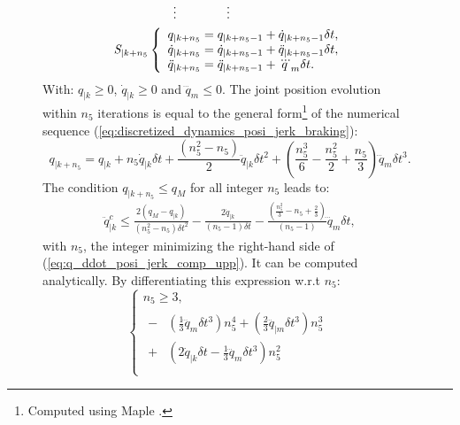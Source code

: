 \begin{figure}[!htbp]
\begin{equation}
\begin{split}
& \hspace{7mm}\vdots\ \hspace{13mm}\vdots\ \\
\textit{S}_{|k+n_{5}}&\left\{\begin{array}{lcl}
q_{|k+n_{5}} = q_{|k+n_{5}-1} + \dot{q}_{|k+n_{5}-1} \delta t, \\
\dot{q}_{|k+n_{5}} = \dot{q}_{|k+n_{5}-1} + \ddot{q}_{|k+n_{5}-1} \delta t, \\
\ddot{q}_{|k+n_{5}} = \ddot{q}_{|k+n_{5}-1} + \dddot{q}_{m} \delta t.
\end{array}\right.
\end{split}
\label{eq:discretized_dynamics_posi_jerk_braking}
\end{equation}
With: $q_{|k} \geq 0$, $\dot{q}_{|k} \geq 0$ and  $\dddot{q}_{m} \leq 0$. The joint position evolution within $n_5$ iterations is equal to the general form\footnote{Computed using Maple \cite{maple}.} of the numerical sequence (\ref{eq:discretized_dynamics_posi_jerk_braking}):
\begin{equation}
q_{|k+n_5} = q_{|k} + n_5 \dot{q}_{|k} \delta t +  \frac{\left(n_5^2-n_5\right)}{2} \ddot{q}_{|k} \delta t^2 + \left(\frac{n_5^3}{6}-\frac{n_5^2}{2}+\frac{n_5}{3}\right) \dddot{q}_m \delta t^3.
\label{eq:q_evolution_with_const_qdddot_m}
\end{equation}
The condition $q_{|k+n_5} \leq q_{M}$ for all integer $n_5$ leads to:
\begin{equation}
\begin{split}
\ddot{q}_{|k}^{c} \leq \frac{2\left(q_M-q_{|k}\right)}{\left(n_5^2-n_5\right) \delta t^2} - \frac{2 \dot{q}_{|k}}{\left(n_5-1\right) \delta t} - \frac{\left(\frac{n_5^2}{3}-n_5+\frac{2}{3}\right)}{\left(n_5-1\right)}\dddot{q}_m \delta t,
\label{eq:q_ddot_posi_jerk_comp_upp}
\end{split}
\end{equation}
with $n_5$, the integer minimizing the right-hand side of (\ref{eq:q_ddot_posi_jerk_comp_upp}). It can be computed analytically. By differentiating this expression w.r.t $n_5$:
\begin{equation}
\left\{\begin{array}{lcl}
n_5 \geq 3, \\
\begin{split}
-&\left(\frac{1}{3} \dddot{q}_m \delta t^3\right) n_5^4 + \left(\frac{2}{3} \dddot{q}_{|m} \delta t^3\right) n_5^3  \\
+&\left(2 \dot{q}_{|k} \delta t - \frac{1}{3} \dddot{q}_m \delta t^3\right) n_5^2 \\

\end{split}
\end{array}
\end{equation}
\end{figure}
